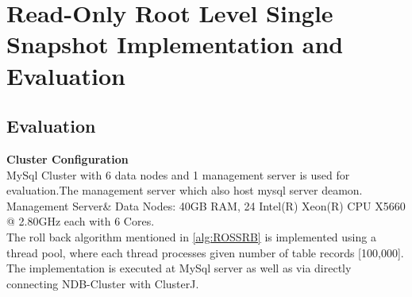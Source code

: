 
%
%
%


\chapter{Read-Only Root Level Single Snapshot Implementation and Evaluation}
\label{ch:RONSIE}




\section{Evaluation}
\textbf{Cluster Configuration}\\
MySql Cluster with 6 data nodes and 1 management server is used for evaluation.The management server which also host mysql server deamon.\\
Management Server\& Data Nodes: 40GB RAM, 24 Intel(R) Xeon(R) CPU X5660  @ 2.80GHz each with 6 Cores.\\

The roll back algorithm mentioned in \ref{alg:ROSSRB} is implemented using a thread pool, where each thread processes given number of table records [100,000]. The implementation is executed at MySql server as well as via directly connecting NDB-Cluster\cite{29} with ClusterJ\cite{clusterj}. 

